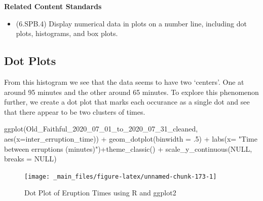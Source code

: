 \documentclass[
]{book}
\newenvironment{Shaded}{\begin{snugshade}}{\end{snugshade}}
\newcommand{\AttributeTok}[1]{\textcolor[rgb]{0.77,0.63,0.00}{#1}}
\newcommand{\ConstantTok}[1]{\textcolor[rgb]{0.00,0.00,0.00}{#1}}
\newcommand{\DecValTok}[1]{\textcolor[rgb]{0.00,0.00,0.81}{#1}}
\newcommand{\FunctionTok}[1]{\textcolor[rgb]{0.00,0.00,0.00}{#1}}
\newcommand{\NormalTok}[1]{#1}
\newcommand{\SpecialCharTok}[1]{\textcolor[rgb]{0.00,0.00,0.00}{#1}}
\newcommand{\StringTok}[1]{\textcolor[rgb]{0.31,0.60,0.02}{#1}}
\providecommand{\tightlist}{%
  \setlength{\itemsep}{0pt}\setlength{\parskip}{0pt}}
\newenvironment{standards}{}{}
\theoremstyle{definition}
\theoremstyle{definition}
\theoremstyle{definition}
\theoremstyle{definition}
\theoremstyle{remark}
\begin{document}
\begin{standards}

\begin{center}
\textbf{Related Content Standards}

\end{center}

\begin{itemize}
\tightlist
\item
  (6.SPB.4) Display numerical data in plots on a number line, including dot plots, histograms, and box plots.
\end{itemize}

\end{standards}

\hypertarget{dot-plots}{%
\subsection{Dot Plots}\label{dot-plots}}

From this histogram we see that the data seems to have two `centers'. One at around 95 minutes and the other around 65 minutes. To explore this phenomenon further, we create a dot plot that marks each occurance as a single dot and see that there appear to be two clusters of times.

\begin{Shaded}
\begin{Highlighting}[]
\FunctionTok{ggplot}\NormalTok{(Old\_Faithful\_2020\_07\_01\_to\_2020\_07\_31\_cleaned, }\FunctionTok{aes}\NormalTok{(}\AttributeTok{x=}\NormalTok{inter\_erruption\_time)) }\SpecialCharTok{+} \FunctionTok{geom\_dotplot}\NormalTok{(}\AttributeTok{binwidth =}\NormalTok{ .}\DecValTok{5}\NormalTok{) }\SpecialCharTok{+} \FunctionTok{labs}\NormalTok{(}\AttributeTok{x=} \StringTok{"Time between erruptions (minutes)"}\NormalTok{)}\SpecialCharTok{+}\FunctionTok{theme\_classic}\NormalTok{() }\SpecialCharTok{+} \FunctionTok{scale\_y\_continuous}\NormalTok{(}\ConstantTok{NULL}\NormalTok{, }\AttributeTok{breaks =} \ConstantTok{NULL}\NormalTok{)}
\end{Highlighting}
\end{Shaded}

\begin{figure}

{\centering \texttt{[image: \_main\_files/figure-latex/unnamed-chunk-173-1]} 

}

\caption{Dot Plot of Eruption Times using R and ggplot2}\label{fig:unnamed-chunk-173}
\end{figure}
\end{document}
